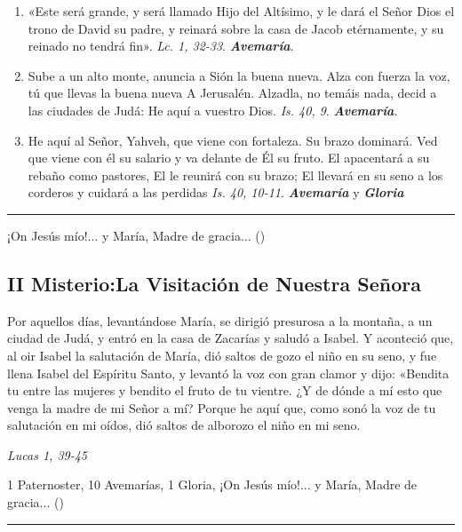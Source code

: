 \documentclass[./rosary.tex]{subfiles}
\begin{document}
\begin{enumerate}
    \item «Este será grande, y será llamado Hijo del Altísimo, y le dará el Señor Dios el trono de David su padre,
          y reinará sobre la casa de Jacob etérnamente, y su reinado no tendrá fin».  \emph{Lc. 1, 32-33}. \textbf{\emph{Avemaría}}.

    \item Sube a un alto monte, anuncia a Sión la buena nueva. Alza con fuerza la voz, tú que llevas la buena nueva A Jerusalén. Alzadla, no temáis nada, decid a las ciudades de Judá:
          He aquí a vuestro Dios. \emph{Is. 40, 9}. \textbf{\emph{Avemaría}}.

    \item He aquí al Señor, Yahveh, que viene con fortaleza. Su brazo dominará. Ved que viene con él su salario y va delante de Él su fruto. El apacentará a su rebaño como pastores,
          El le reunirá con su brazo; El llevará en su seno a los corderos y cuidará a las perdidas \emph{Is. 40, 10-11}.
          \textbf{\emph{Avemaría}} y \textbf{\emph{Gloria}}
\end{enumerate}

\rule{\textwidth}{0.5pt}
¡On Jesús mío!... y María, Madre de gracia... ()

\subsection*{II Misterio:La Visitación de Nuestra Señora}

Por aquellos días, levantándose María, se dirigió presurosa a la montaña, a un ciudad de Judá, y entró en la casa de Zacarías y saludó a Isabel.
Y aconteció que, al oir Isabel la salutación de María, dió saltos de gozo el niño en su seno, y fue llena Isabel del Espíritu Santo,
y levantó la voz con gran clamor y dijo: «Bendita tu entre las mujeres y bendito el fruto de tu vientre. ¿Y de dónde a mí esto que venga la madre de mi Señor a mí?
Porque he aquí que, como sonó la voz de tu salutación en mi oídos, dió saltos de alborozo el niño en mi seno.

\begin{flushright}
    \emph{Lucas 1, 39-45}
\end{flushright}

1 Paternoster, 10 Avemarías, 1 Gloria, ¡On Jesús mío!... y María, Madre de gracia... ()

\rule{\textwidth}{0.5pt}
\end{document}
